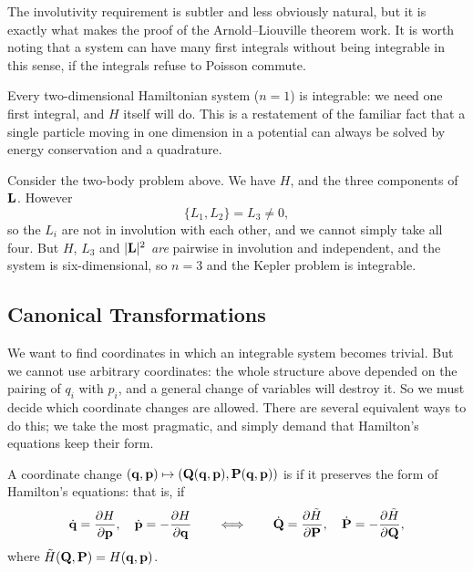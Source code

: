 \documentclass[a4paper]{scrartcl}
\begin{document}
The involutivity requirement is subtler and less obviously natural, but it is exactly what makes the proof of the Arnold--Liouville theorem work. It is worth noting that a system can have many first integrals without being integrable in this sense, if the integrals refuse to Poisson commute.

\begin{example}
	Every two-dimensional Hamiltonian system ($n = 1$) is integrable: we need one first integral, and $H$ itself will do. This is a restatement of the familiar fact that a single particle moving in one dimension in a potential can always be solved by energy conservation and a quadrature.
\end{example}

\begin{example}
	Consider the two-body problem above. We have $H$, and the three components of $\mathbf{L}$. However
	$$
	\{L_1, L_2\} = L_3 \neq 0,
	$$
	so the $L_i$ are not in involution with each other, and we cannot simply take all four. But $H$, $L_3$ and $|\mathbf{L}|^2$ \emph{are} pairwise in involution and independent, and the system is six-dimensional, so $n = 3$ and the Kepler problem is integrable.
\end{example}

\subsection{Canonical Transformations}

We want to find coordinates in which an integrable system becomes trivial. But we cannot use arbitrary coordinates: the whole structure above depended on the pairing of $q_i$ with $p_i$, and a general change of variables will destroy it. So we must decide which coordinate changes are allowed. There are several equivalent ways to do this; we take the most pragmatic, and simply demand that Hamilton's equations keep their form.

\begin{definition}
	A coordinate change $(\mathbf{q}, \mathbf{p})\mapsto (\mathbf{Q}(\mathbf{q}, \mathbf{p}), \mathbf{P}(\mathbf{q}, \mathbf{p}))$ is  if it preserves the form of Hamilton's equations: that is, if
	$$
	\dot{\mathbf{q}} = \frac{\partial H}{\partial \mathbf{p}}, \quad \dot{\mathbf{p}} = -\frac{\partial H}{\partial \mathbf{q}}
	\qquad\Longleftrightarrow\qquad
	\dot{\mathbf{Q}} = \frac{\partial \tilde H}{\partial \mathbf{P}}, \quad \dot{\mathbf{P}} = -\frac{\partial \tilde H}{\partial \mathbf{Q}},
	$$
	where $\tilde H(\mathbf{Q}, \mathbf{P}) = H(\mathbf{q}, \mathbf{p})$.
\end{definition}
\end{document}
